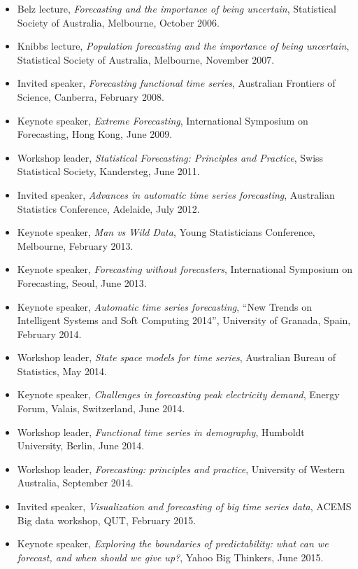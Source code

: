 \documentclass[10pt,a4paper,]{article}
\providecommand{\tightlist}{%
  \setlength{\itemsep}{0pt}\setlength{\parskip}{0pt}}
\begin{document}
\begin{itemize}
\tightlist
\item
  Belz lecture, \emph{Forecasting and the importance of being uncertain}, Statistical Society of Australia, Melbourne, October 2006.
\item
  Knibbs lecture, \emph{Population forecasting and the importance of being uncertain}, Statistical Society of Australia, Melbourne, November 2007.
\item
  Invited speaker, \emph{Forecasting functional time series}, Australian Frontiers of Science, Canberra, February 2008.
\item
  Keynote speaker, \emph{Extreme Forecasting}, International Symposium on Forecasting, Hong Kong, June 2009.
\item
  Workshop leader, \emph{Statistical Forecasting: Principles and Practice}, Swiss Statistical Society, Kandersteg, June 2011.
\item
  Invited speaker, \emph{Advances in automatic time series forecasting}, Australian Statistics Conference, Adelaide, July 2012.
\item
  Keynote speaker, \emph{Man vs Wild Data}, Young Statisticians Conference, Melbourne, February 2013.
\item
  Keynote speaker, \emph{Forecasting without forecasters}, International Symposium on Forecasting, Seoul, June 2013.
\item
  Keynote speaker, \emph{Automatic time series forecasting}, ``New Trends on Intelligent Systems and Soft Computing 2014'', University of Granada, Spain, February 2014.
\item
  Workshop leader, \emph{State space models for time series}, Australian Bureau of Statistics, May 2014.
\item
  Keynote speaker, \emph{Challenges in forecasting peak electricity demand}, Energy Forum, Valais, Switzerland, June 2014.
\item
  Workshop leader, \emph{Functional time series in demography}, Humboldt University, Berlin, June 2014.
\item
  Workshop leader, \emph{Forecasting: principles and practice}, University of Western Australia, September 2014.
\item
  Invited speaker, \emph{Visualization and forecasting of big time series data}, ACEMS Big data workshop, QUT, February 2015.
\item
  Keynote speaker, \emph{Exploring the boundaries of predictability: what can we forecast, and when should we give up?}, Yahoo Big Thinkers, June 2015.

\end{itemize}
\end{document}
